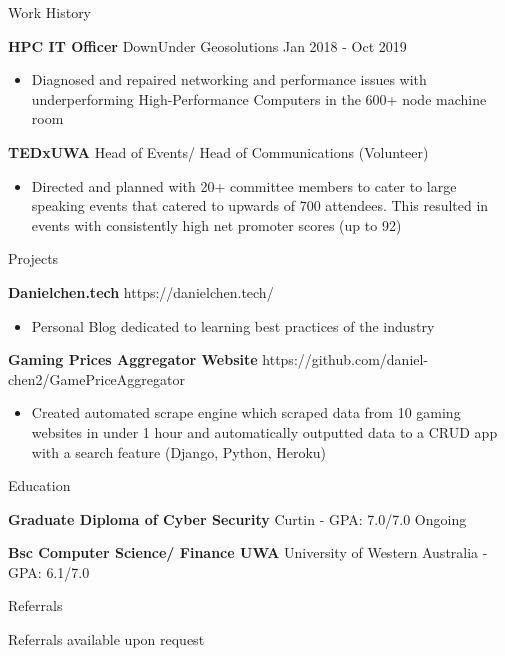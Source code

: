 \documentclass{resume} %
\begin{document}
\begin{rSection}{Work History}
		\item \textbf{HPC IT Officer} {DownUnder Geosolutions} \hfill Jan 2018 - Oct 2019
		\begin{itemize} 

			\item  Diagnosed and repaired networking and performance issues with underperforming High-Performance Computers in the 600+ node machine room
		\end{itemize}

		\item \textbf{TEDxUWA} {Head of Events/ Head of Communications} (Volunteer) 
		\begin{itemize} 
			\item Directed and planned with 20+ committee members to cater to large speaking events that catered to upwards of 700 attendees. This resulted in events with consistently high net promoter scores (up to 92)  
		\end{itemize}
	\end{rSection} 
	
	\begin{rSection}{Projects}
		\vspace{-1.25em}
		\item \textbf{Danielchen.tech} {\hfill {} https://danielchen.tech/}  
		\begin{itemize} 
			\item Personal Blog dedicated to learning best practices of the industry
		\end{itemize}
		\item \textbf{Gaming Prices Aggregator Website} {\hfill {} https://github.com/daniel-chen2/GamePriceAggregator}  
		\begin{itemize} 
			\item Created automated scrape engine which scraped data from 10 gaming websites in under 1 hour and automatically outputted data to a CRUD app with a search feature (Django, Python, Heroku)
		\end{itemize}
	\end{rSection} 
	
	\begin{rSection}{Education}
		\vspace{-1.25em}
		\item \textbf{Graduate Diploma of Cyber Security} {Curtin} - GPA: 7.0/7.0 \hfill Ongoing
		\item \textbf{Bsc Computer Science/ Finance UWA} {University of Western Australia} - GPA: 6.1/7.0 \hfill 
	\end{rSection} 
	
	\begin{rSection}{Referrals} 
		\vspace{-1.25em}
		\item Referrals available upon request
	\end{rSection}
\end{document}
